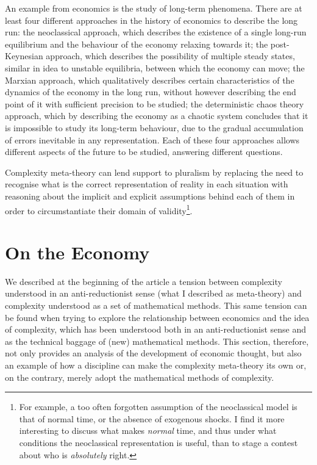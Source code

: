 \documentclass[a4paper, headings=standardclasses]{scrartcl}
\begin{document}
An example from economics is the study of long-term phenomena.
There are at least four different approaches in the history of economics to describe the long run: the neoclassical approach, which describes the existence of a single long-run equilibrium and the behaviour of the economy relaxing towards it; the post-Keynesian approach, which describes the possibility of multiple steady states, similar in idea to unstable equilibria, between which the economy can move; the Marxian approach, which qualitatively describes certain characteristics of the dynamics of the economy in the long run, without however describing the end point of it with sufficient precision to be studied; the deterministic chaos theory approach, which by describing the economy as a chaotic system concludes that it is impossible to study its long-term behaviour, due to the gradual accumulation of errors inevitable in any representation.
Each of these four approaches allows different aspects of the future to be studied, answering different questions.

Complexity meta-theory can lend support to pluralism by replacing the need to recognise what is the correct representation of reality in each situation with reasoning about the implicit and explicit assumptions behind each of them in order to circumstantiate their domain of validity\footnote{For example, a too often forgotten assumption of the neoclassical model is that of normal time, or the absence of exogenous shocks. I find it more interesting to discuss what makes \textit{normal} time, and thus under what conditions the neoclassical representation is useful, than to stage a contest about who is \textit{absolutely} right.}.

\section{On the Economy}
We described at the beginning of the article a tension between complexity understood in an anti-reductionist sense (what I described as meta-theory) and complexity understood as a set of mathematical methods.
This same tension can be found when trying to explore the relationship between economics and the idea of complexity, which has been understood both in an anti-reductionist sense and as the technical baggage of (new) mathematical methods.
This section, therefore, not only provides an analysis of the development of economic thought, but also an example of how a discipline can make the complexity meta-theory its own or, on the contrary, merely adopt the mathematical methods of complexity.
\end{document}
